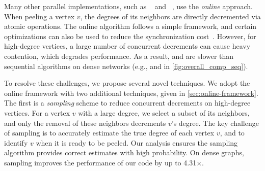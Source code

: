 Many other parallel \kcore{} implementations, such as \pkc{}~\cite{kabir2017parallel} and \park{}~\cite{dasari2014park}, 
use the \emph{online} approach. 
When peeling a vertex $v$, the degrees of its neighbors are directly decremented via atomic operations.
The online algorithm follows a simple framework, and %
certain optimizations can also be used to reduce the synchronization cost~\cite{kabir2017parallel}. 
However, for high-degree vertices, a large number of concurrent decrements can cause heavy contention, 
which degrades performance.
As a result, \pkc{} and \park{} are slower than sequential algorithms on dense networks
(e.g., \TW{} and \SD{} in \cref{fig:overall_comp_seq}).  

To resolve these challenges, we propose several novel techniques. 
We adopt the online framework with two additional techniques, given in \cref{sec:online-framework}. 
The first is a \emph{sampling} scheme to reduce concurrent decrements on high-degree vertices.
For a vertex $v$ with a large degree, 
we select a subset of its neighbors, 
and only the removal of these neighbors decrements $v$'s degree.
The key challenge of sampling is to accurately estimate the true degree of each vertex $v$, 
and to identify $v$ when it is ready to be peeled. 
Our analysis ensures the sampling algorithm provides correct estimates with high probability.
On dense graphs, sampling improves the performance of our code by up to 4.31$\times$. 

